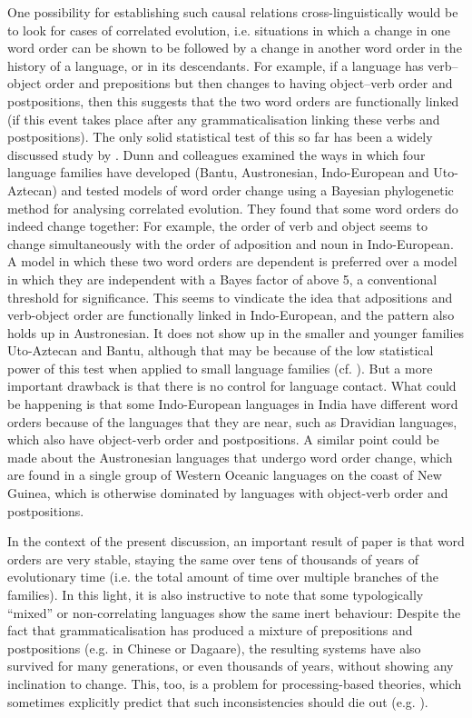 \documentclass[output=paper]{langsci/langscibook}
\begin{document}
One possibility for establishing such causal relations cross-linguistically would be to look for cases of correlated evolution, i.e. situations in which a change in one word order can be shown to be followed by a change in another word order in the history of a language, or in its descendants. For example, if a language has verb–object order and prepositions but then changes to having object–verb order and postpositions, then this suggests that the two word orders are functionally linked (if this event takes place after any grammaticalisation linking these verbs and postpositions). The only solid statistical test of this so far has been a widely discussed study by \citet{DunnEtAl2011}. Dunn and colleagues examined the ways in which four language families have developed (Bantu, Austronesian, Indo-European and Uto-Aztecan) and tested models of word order change using a Bayesian phylogenetic method for analysing correlated evolution. They found that some word orders do indeed change together: For example, the order of verb and object seems to change simultaneously with the order of adposition and noun in Indo-European. A model in which these two word orders are dependent is preferred over a model in which they are independent with a Bayes factor of above 5, a conventional threshold for significance. This seems to vindicate the idea that adpositions and verb-object order are functionally linked in Indo-European, and the pattern also holds up in Austronesian. It does not show up in the smaller and younger families Uto-Aztecan and Bantu, although that may be because of the low statistical power of this test when applied to small language families (cf. \citealt{CroftEtAl2011}). But a more important drawback is that there is no control for language contact. What could be happening is that some Indo-European languages in India have different word orders because of the languages that they are near, such as Dravidian languages, which also have object-verb order and postpositions.  A similar point could be made about the Austronesian languages that undergo word order change, which are found in a single group of Western Oceanic languages on the coast of New Guinea, which is otherwise dominated by languages with object-verb order and postpositions.

In the context of the present discussion, an important result of  paper is that word orders are very stable, staying the same over tens of thousands of years of evolutionary time (i.e. the total amount of time over multiple branches of the families). In this light, it is also instructive to note that some typologically “mixed” or non-correlating languages show the same inert behaviour: Despite the fact that grammaticalisation has produced a mixture of prepositions and postpositions (e.g. in Chinese or Dagaare), the resulting systems have also survived for many generations, or even thousands of years, without showing any inclination to change. This, too, is a problem for processing-based theories, which sometimes explicitly predict that such inconsistencies should die out (e.g. \citealt{KirbyHurford1997}).
\end{document}
